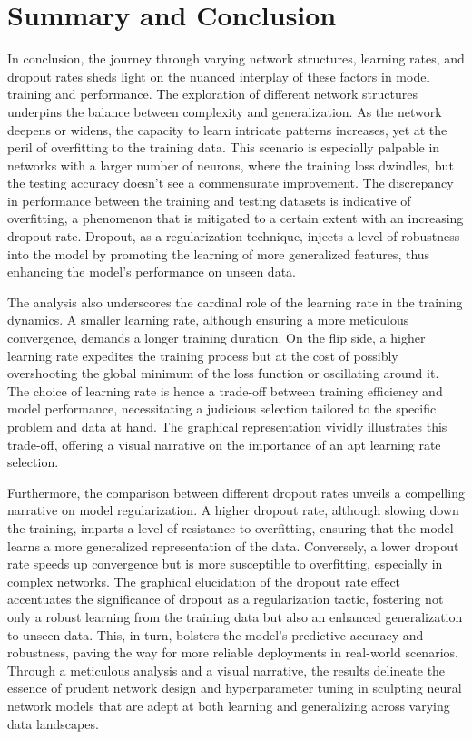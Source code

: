 \documentclass[10pt,twocolumn,letterpaper]{article}
\begin{document}
\section{Summary and Conclusion}

In conclusion, the journey through varying network structures, learning rates, and dropout rates sheds light on the nuanced interplay of these factors in model training and performance. The exploration of different network structures underpins the balance between complexity and generalization. As the network deepens or widens, the capacity to learn intricate patterns increases, yet at the peril of overfitting to the training data. This scenario is especially palpable in networks with a larger number of neurons, where the training loss dwindles, but the testing accuracy doesn't see a commensurate improvement. The discrepancy in performance between the training and testing datasets is indicative of overfitting, a phenomenon that is mitigated to a certain extent with an increasing dropout rate. Dropout, as a regularization technique, injects a level of robustness into the model by promoting the learning of more generalized features, thus enhancing the model's performance on unseen data.

The analysis also underscores the cardinal role of the learning rate in the training dynamics. A smaller learning rate, although ensuring a more meticulous convergence, demands a longer training duration. On the flip side, a higher learning rate expedites the training process but at the cost of possibly overshooting the global minimum of the loss function or oscillating around it. The choice of learning rate is hence a trade-off between training efficiency and model performance, necessitating a judicious selection tailored to the specific problem and data at hand. The graphical representation vividly illustrates this trade-off, offering a visual narrative on the importance of an apt learning rate selection.

Furthermore, the comparison between different dropout rates unveils a compelling narrative on model regularization. A higher dropout rate, although slowing down the training, imparts a level of resistance to overfitting, ensuring that the model learns a more generalized representation of the data. Conversely, a lower dropout rate speeds up convergence but is more susceptible to overfitting, especially in complex networks. The graphical elucidation of the dropout rate effect accentuates the significance of dropout as a regularization tactic, fostering not only a robust learning from the training data but also an enhanced generalization to unseen data. This, in turn, bolsters the model's predictive accuracy and robustness, paving the way for more reliable deployments in real-world scenarios. Through a meticulous analysis and a visual narrative, the results delineate the essence of prudent network design and hyperparameter tuning in sculpting neural network models that are adept at both learning and generalizing across varying data landscapes.




   {\small
      
      
   }
\end{document}
